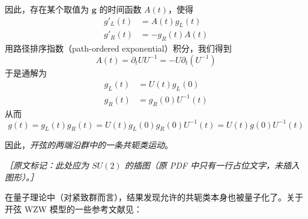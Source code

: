 因此，存在某个取值为 $\mathbf{g}$ 的时间函数 $A(t)$，使得
\begin{equation}
  \begin{aligned}
    g'_L(t)&=A(t)g_L(t)\\
    g'_R(t)&=-g_R(t)A(t)
  \end{aligned}
  \tag{4.233}
  \label{eq:4.233}
\end{equation}
用路径排序指数（path-ordered exponential）积分，我们得到
\begin{equation}
  A(t)=\partial_tUU^{-1}=-U\partial_t(U^{-1})
  \tag{4.234}
  \label{eq:4.234}
\end{equation}
于是通解为
\begin{equation}
  \begin{aligned}
    g_L(t)&=U(t)g_L(0)\\
    g_R(t)&=g_R(0)U^{-1}(t)
  \end{aligned}
  \tag{4.235}
  \label{eq:4.235}
\end{equation}
从而
\begin{equation}
  g(t)=g_L(t)g_R(t)=U(t)g_L(0)g_R(0)U^{-1}(t)=U(t)g(0)U^{-1}(t)
  \tag{4.236}
  \label{eq:4.236}
\end{equation}

因此，\emph{开弦的两端沿群中的一条共轭类运动}。

{\small\itshape ［原文标记：此处应为 $SU(2)$ 的插图（原 PDF 中只有一行占位文字，未插入图形）。］}

在量子理论中（对紧致群而言），结果发现允许的共轭类本身也被量子化了。关于开弦 WZW 模型的一些参考文献见：

